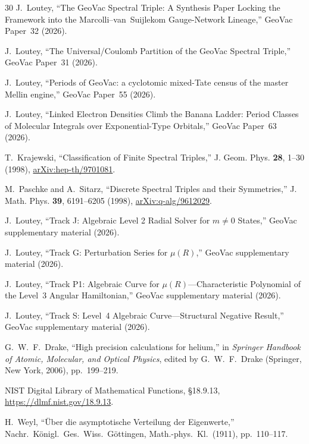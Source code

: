 \documentclass[aps,pra,twocolumn,superscriptaddress,longbibliography]{revtex4-2}
\begin{document}
\begin{thebibliography}{30}
J.~Loutey,
``The GeoVac Spectral Triple: A Synthesis Paper Locking the Framework
into the Marcolli--van~Suijlekom Gauge-Network Lineage,''
GeoVac Paper~32 (2026).

J.~Loutey,
``The Universal/Coulomb Partition of the GeoVac Spectral Triple,''
GeoVac Paper~31 (2026).

J.~Loutey,
``Periods of GeoVac: a cyclotomic mixed-Tate census of the
master Mellin engine,''
GeoVac Paper~55 (2026).

J.~Loutey,
``Linked Electron Densities Climb the Banana Ladder: Period Classes of
Molecular Integrals over Exponential-Type Orbitals,''
GeoVac Paper~63 (2026).

T.~Krajewski,
``Classification of Finite Spectral Triples,''
J. Geom. Phys. \textbf{28}, 1--30 (1998),
\href{https://arxiv.org/abs/hep-th/9701081}{arXiv:hep-th/9701081}.

M.~Paschke and A.~Sitarz,
``Discrete Spectral Triples and their Symmetries,''
J. Math. Phys. \textbf{39}, 6191--6205 (1998),
\href{https://arxiv.org/abs/q-alg/9612029}{arXiv:q-alg/9612029}.

J.~Loutey,
``Track J: Algebraic Level 2 Radial Solver for $m \neq 0$ States,''
GeoVac supplementary material (2026).

J.~Loutey,
``Track G: Perturbation Series for $\mu(R)$,''
GeoVac supplementary material (2026).

J.~Loutey,
``Track P1: Algebraic Curve for $\mu(R)$---Characteristic Polynomial
of the Level~3 Angular Hamiltonian,''
GeoVac supplementary material (2026).

J.~Loutey,
``Track S: Level~4 Algebraic Curve---Structural Negative Result,''
GeoVac supplementary material (2026).

G.~W.~F.~Drake,
``High precision calculations for helium,''
in \textit{Springer Handbook of Atomic, Molecular, and Optical Physics},
edited by G.~W.~F.~Drake (Springer, New York, 2006), pp.~199--219.

NIST Digital Library of Mathematical Functions,
\S18.9.13, \url{https://dlmf.nist.gov/18.9.13}.

H.~Weyl,
``\"Uber die asymptotische Verteilung der Eigenwerte,''
Nachr.\ K\"onigl.\ Ges.\ Wiss.\ G\"ottingen, Math.-phys.\ Kl.\
(1911), pp.\ 110--117.


\end{thebibliography}
\end{document}
